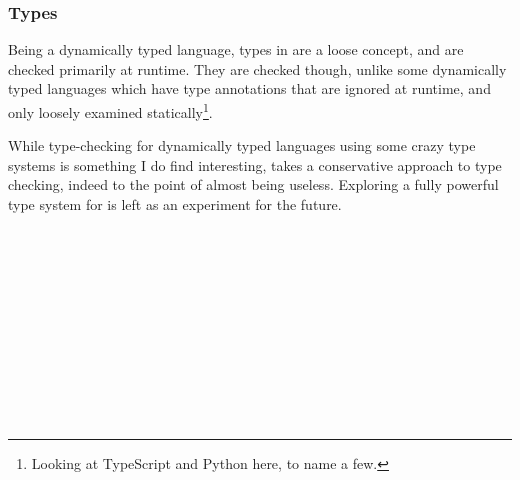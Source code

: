 \subsubsection{Types}

%

Being a dynamically typed language, types in \Trilogy{} are a loose concept,
and are checked primarily at runtime. They are checked though, unlike some
dynamically typed languages which have type annotations that are
ignored at runtime, and only loosely examined statically\footnote{Looking at TypeScript and Python here, to name a few.}.

While type-checking for dynamically typed languages using some crazy
type systems is something I do find interesting, \Trilogy{} takes a
conservative approach to type checking, indeed to the point of almost
being useless. Exploring a fully powerful type system for \Trilogy{}
is left as an experiment for the future.

\begin{bnf*}
     \\
     \\
     \\
     \\
     \\
     \\
     \\
     \\
     \\
     \\
\end{bnf*}

